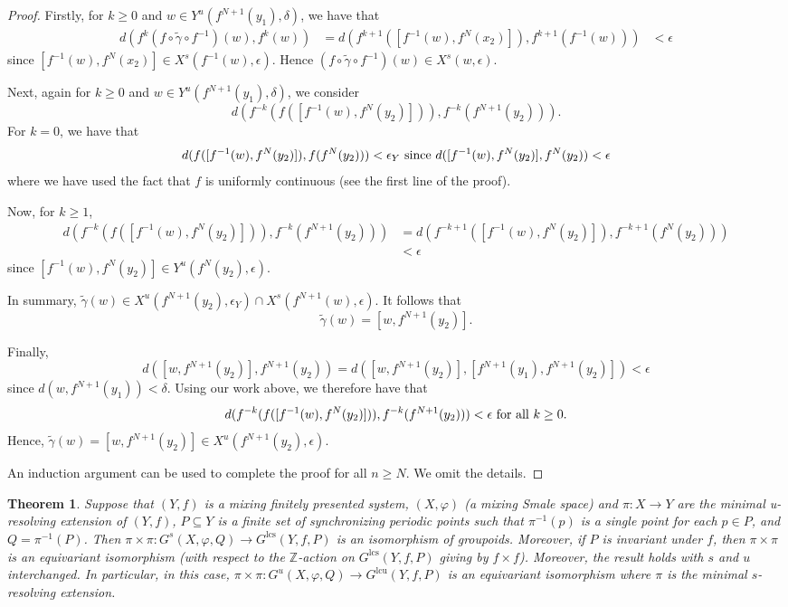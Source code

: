 \documentclass{amsart}
\newcommand{\Z}{{\mathbb Z}}
\newcommand{\lcu}{\text{lcu}}
\newcommand{\lcs}{\text{lcs}}
\theoremstyle{plain}
\newtheorem{theorem}{Theorem}[section]
\theoremstyle{definition}
\theoremstyle{remark}
\begin{document}
\begin{proof}
Firstly, for $k\ge 0$ and $w\in Y^u(f^{N+1}(y_1), \delta)$, we have that 
\begin{align*} 
d(f^k (f \circ \tilde{\gamma}\circ f^{-1})(w), f^k(w)) & = d(f^{k+1}( [f^{-1}(w), f^N(x_2)]), f^{k+1} (f^{-1}(w)))
& < \epsilon 
\end{align*}
since $[f^{-1}(w), f^N(x_2)]\in X^s(f^{-1}(w), \epsilon)$. Hence $(f \circ \tilde{\gamma}\circ f^{-1})(w) \in X^s(w, \epsilon)$.

Next, again for $k\ge 0$ and $w\in Y^u(f^{N+1}(y_1), \delta)$, we consider 
\[ d(f^{-k}(f([f^{-1}(w), f^N(y_2)])), f^{-k}(f^{N+1}(y_2))). \] 
For $k=0$, we have that 
\[ d( f([f^{-1}(w), f^N(y_2)]), f(f^N(y_2)))< \epsilon_Y \hbox{ since }d( [f^{-1}(w), f^N(y_2)], f^N(y_2))< \epsilon \]
where we have used the fact that $f$ is uniformly continuous (see the first line of the proof).

Now, for $k\geq 1$, 
\begin{align*} d(f^{-k}(f([f^{-1}(w), f^N(y_2)])), f^{-k}(f^{N+1}(y_2))) & =d(f^{-k+1}([f^{-1}(w), f^N(y_2)]), f^{-k+1}(f^{N}(y_2))) \\
& < \epsilon 
\end{align*}
since $[f^{-1}(w), f^N(y_2)] \in Y^u(f^{N}(y_2), \epsilon)$.

In summary, $\tilde{\gamma}(w) \in X^u(f^{N+1}(y_2), \epsilon_Y) \cap X^s(f^{N+1}(w), \epsilon)$. It follows that 
\[ \tilde{\gamma}(w)= [w, f^{N+1}(y_2)]. \]

Finally, 
\[
d([w, f^{N+1}(y_2)], f^{N+1}(y_2))=d([w, f^{N+1}(y_2)], [f^{N+1}(y_1), f^{N+1}(y_2)])< \epsilon
\]
since $d(w, f^{N+1}(y_1))< \delta$. Using our work above, we therefore have that
\[
d(f^{-k}(f([f^{-1}(w), f^N(y_2)])), f^{-k}(f^{N+1}(y_2)))< \epsilon \hbox{ for all }k\ge 0.
\] 
Hence, $\tilde{\gamma}(w)=[w, f^{N+1}(y_2)] \in X^u(f^{N+1}(y_2), \epsilon).$ 

An induction argument can be used to complete the proof for all $n\ge N$. We omit the details.
\end{proof}






\begin{theorem} \label{thm:main}
Suppose that $(Y, f)$ is a mixing finitely presented system, $(X, \varphi)$ (a mixing Smale space) and $\pi: X \rightarrow Y$ are the minimal u-resolving extension of $(Y, f)$, $P \subseteq Y$ is a finite set of synchronizing periodic points such that $\pi^{-1}(p)$ is a single point for each $p\in P$, and $Q=\pi^{-1}(P)$. Then $\pi \times \pi : G^s(X, \varphi, Q) \rightarrow G^\lcs(Y, f, P)$ is an isomorphism of groupoids. Moreover, if $P$ is invariant under $f$, then $\pi\times \pi$ is an equivariant isomorphism (with respect to the $\Z$-action on $G^\lcs(Y, f, P)$ giving by $f\times f$). Moreover, the result holds with $s$ and $u$ interchanged. In particular, in this case, $\pi \times \pi : G^u(X, \varphi, Q) \rightarrow G^\lcu(Y, f, P)$ is an equivariant isomorphism where $\pi$ is the minimal $s$-resolving extension.
\end{theorem}
\end{document}
